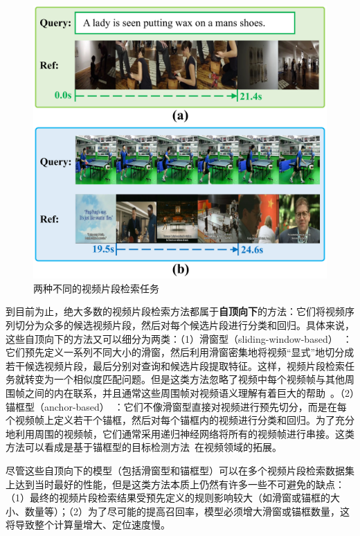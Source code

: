 \begin{figure}[t]
    \centering
    \includegraphics[width=0.8\linewidth]{chapter6/res/qbvl.pdf}
    \caption{两种不同的视频片段检索任务}
    \label{ch6:fig:qbvl}
\end{figure}

到目前为止，绝大多数的视频片段检索方法都属于\textbf{自顶向下}的方法：它们将视频序列切分为众多的候选视频片段，然后对每个候选片段进行分类和回归。具体来说，这些自顶向下的方法又可以细分为两类：（1）滑窗型（sliding-window-based）~\cite{gao2017tall,anne2017localizing,liu2018attentive,liu2018cross,ge2019mac,chen2019semantic,xu2019multilevel,zhang2019exploiting}：它们预先定义一系列不同大小的滑窗，然后利用滑窗密集地将视频“显式”地切分成若干候选视频片段，最后分别对查询和候选片段提取特征。这样，视频片段检索任务就转变为一个相似度匹配问题。但是这类方法忽略了视频中每个视频帧与其他周围帧之间的内在联系，并且通常这些周围帧对视频语义理解有着巨大的帮助~\cite{wu2019long}。（2）锚框型（anchor-based）~\cite{chen2018temporally,zhang2019man}：它们不像滑窗型直接对视频进行预先切分，而是在每个视频帧上定义若干个锚框，然后对每个锚框内的视频进行分类和回归。为了充分地利用周围的视频帧，它们通常采用递归神经网络将所有的视频帧进行串接。这类方法可以看成是基于锚框型的目标检测方法~\cite{ren2015faster}在视频领域的拓展。

尽管这些自顶向下的模型（包括滑窗型和锚框型）可以在多个视频片段检索数据集上达到当时最好的性能，但是这类方法本质上仍然有许多一些不可避免的缺点：（1）最终的视频片段检索结果受预先定义的规则影响较大（如滑窗或锚框的大小、数量等）；（2）为了尽可能的提高召回率，模型必须增大滑窗或锚框数量，这将导致整个计算量增大、定位速度慢。


